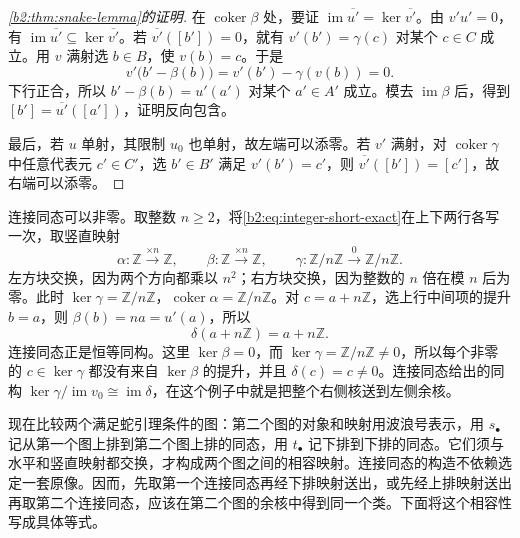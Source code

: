 \begin{proof}[\cref{b2:thm:snake-lemma}的证明]
	在 \(\operatorname{coker}\beta\) 处，要证 \(\operatorname{im}\overline{u'}=\ker\overline{v'}\)。由 \(v'u'=0\)，有 \(\operatorname{im}\overline{u'}\subseteq\ker\overline{v'}\)。若 \(\overline{v'}([b'])=0\)，就有 \(v'(b')=\gamma(c)\) 对某个 \(c\in C\) 成立。用 \(v\) 满射选 \(b\in B\)，使 \(v(b)=c\)。于是
	\[
		v'\bigl(b'-\beta(b)\bigr)=v'(b')-\gamma(v(b))=0.
	\]
	下行正合，所以 \(b'-\beta(b)=u'(a')\) 对某个 \(a'\in A'\) 成立。模去 \(\operatorname{im}\beta\) 后，得到 \([b']=\overline{u'}([a'])\)，证明反向包含。

	最后，若 \(u\) 单射，其限制 \(u_0\) 也单射，故左端可以添零。若 \(v'\) 满射，对 \(\operatorname{coker}\gamma\) 中任意代表元 \(c'\in C'\)，选 \(b'\in B'\) 满足 \(v'(b')=c'\)，则 \(\overline{v'}([b'])=[c']\)，故右端可以添零。
\end{proof}

连接同态可以非零。取整数 \(n\ge2\)，将\eqref{b2:eq:integer-short-exact}在上下两行各写一次，取竖直映射
\[
	\alpha:\mathbb Z\xrightarrow{\times n}\mathbb Z, \qquad\beta:\mathbb Z\xrightarrow{\times n}\mathbb Z, \qquad\gamma:\mathbb Z/n\mathbb Z\xrightarrow{0}\mathbb Z/n\mathbb Z.
\]
左方块交换，因为两个方向都乘以 \(n^2\)；右方块交换，因为整数的 \(n\) 倍在模 \(n\) 后为零。此时 \(\ker\gamma=\mathbb Z/n\mathbb Z\)，\(\operatorname{coker}\alpha=\mathbb Z/n\mathbb Z\)。对 \(c=a+n\mathbb Z\)，选上行中间项的提升 \(b=a\)，则 \(\beta(b)=na=u'(a)\)，所以
\[
	\delta(a+n\mathbb Z)=a+n\mathbb Z.
\]
连接同态正是恒等同构。这里 \(\ker\beta=0\)，而 \(\ker\gamma=\mathbb Z/n\mathbb Z\ne0\)，所以每个非零的 \(c\in\ker\gamma\) 都没有来自 \(\ker\beta\) 的提升，并且 \(\delta(c)=c\ne0\)。连接同态给出的同构 \(\ker\gamma/\operatorname{im}v_0\cong\operatorname{im}\delta\)，在这个例子中就是把整个右侧核送到左侧余核。


现在比较两个满足蛇引理条件的图：第二个图的对象和映射用波浪号表示，用 \(s_\bullet\) 记从第一个图上排到第二个图上排的同态，用 \(t_\bullet\) 记下排到下排的同态。它们须与水平和竖直映射都交换，才构成两个图之间的相容映射。连接同态的构造不依赖选定一套原像。因而，先取第一个连接同态再经下排映射送出，或先经上排映射送出再取第二个连接同态，应该在第二个图的余核中得到同一个类。下面将这个相容性写成具体等式。

